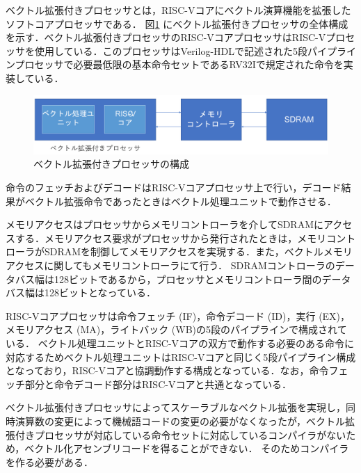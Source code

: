 ベクトル拡張付きプロセッサとは，RISC-Vコアにベクトル演算機能を拡張したソフトコアプロセッサである．
図\ref{fig:MIQS_system}
にベクトル拡張付きプロセッサの全体構成を示す．ベクトル拡張付きプロセッサのRISC-VコアプロセッサはRISC-Vプロセッサを使用している．このプロセッサはVerilog-HDLで記述された5段パイプラインプロセッサで必要最低限の基本命令セットであるRV32Iで規定された命令を実装している．

\begin{figure}[b]
\begin{center}
    \includegraphics[scale=1.0]{image/MIQS_system.pdf}
    \caption{ベクトル拡張付きプロセッサの構成}
    \label{fig:MIQS_system}
\end{center}
\end{figure}

命令のフェッチおよびデコードはRISC-Vコアプロセッサ上で行い，デコード結果がベクトル拡張命令であったときはベクトル処理ユニットで動作させる．

メモリアクセスはプロセッサからメモリコントローラを介してSDRAMにアクセスする．メモリアクセス要求がプロセッサから発行されたときは，メモリコントローラがSDRAMを制御してメモリアクセスを実現する．また，ベクトルメモリアクセスに関してもメモリコントローラにて行う．
SDRAMコントローラのデータバス幅は128ビットであるから，プロセッサとメモリコントローラ間のデータバス幅は128ビットとなっている．

RISC-Vコアプロセッサは命令フェッチ (IF)，命令デコード (ID)，実行 (EX)，メモリアクセス (MA)，ライトバック (WB)の5段のパイプラインで構成されている．
ベクトル処理ユニットとRISC-Vコアの双方で動作する必要のある命令に対応するためベクトル処理ユニットはRISC-Vコアと同じく5段パイプライン構成となっており，RISC-Vコアと協調動作する構成となっている．なお，命令フェッチ部分と命令デコード部分はRISC-Vコアと共通となっている．

ベクトル拡張付きプロセッサによってスケーラブルなベクトル拡張を実現し，同時演算数の変更によって機械語コードの変更の必要がなくなったが，ベクトル拡張付きプロセッサが対応している命令セットに対応しているコンパイラがないため，ベクトル化アセンブリコードを得ることができない．
そのためコンパイラを作る必要がある．